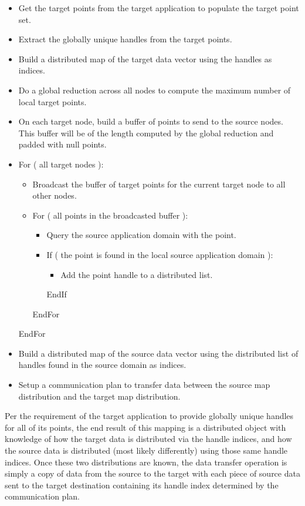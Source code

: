 \documentclass[letterpaper]{article}
\begin{document}
\begin{itemize}
  \item Get the target points from the target application to populate the target point set.
  \item Extract the globally unique handles from the target points.
  \item Build a distributed map of the target data vector using the handles as indices.
  \item Do a global reduction across all nodes to compute the maximum number
    of local target points.
  \item On each target node, build a buffer of points to send to the source nodes. This buffer
    will be of the length computed by the global reduction and padded with null points.

  \item For ( all target nodes ):
    \begin{itemize}
      \item Broadcast the buffer of target points for the current target
        node to all other nodes.

      \item For ( all points in the broadcasted buffer ):
        \begin{itemize}
        \item Query the source application domain with the point.

        \item If ( the point is found in the local source application domain ):
          \begin{itemize}
          \item Add the point handle to a distributed list.
          \end{itemize}
        EndIf
      \end{itemize}
      EndFor
    \end{itemize}
    EndFor

\item Build a distributed map of the source data vector using the
distributed list of handles found in the source domain as indices.
\item Setup a communication plan to transfer data between the source map
distribution and the target map distribution.
\end{itemize}

Per the requirement of the target application to provide globally
unique handles for all of its points, the end result of this mapping
is a distributed object with knowledge of how the target data is
distributed via the handle indices, and how the source
data is distributed (most likely differently) using those same handle
indices. Once these two distributions are known, the data transfer
operation is simply a copy of data from the source to the target with
each piece of source data sent to the target destination containing
its handle index determined by the communication plan. 
\end{document}
